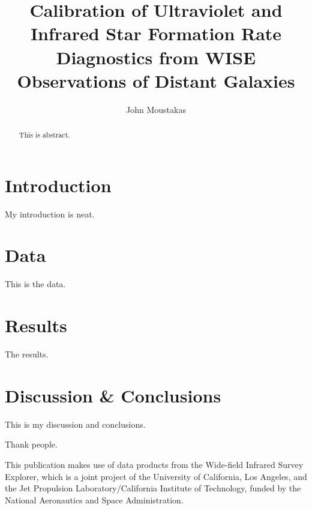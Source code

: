 \documentclass{emulateapj}
\begin{document}
\title{Calibration of Ultraviolet and Infrared Star Formation Rate
  Diagnostics from WISE Observations of Distant Galaxies}

\author{John Moustakas \etal}


\begin{abstract} 
This is abstract.
\end{abstract}


\section{Introduction}\label{sec:intro}
My introduction is neat.  \citep{wright10a}
\section{Data}\label{sec:data}
This is the data.

\section{Results}\label{sec:results}
The results.

\section{Discussion \& Conclusions}\label{sec:discussion}  
This is my discussion and conclusions.

\acknowledgements
Thank people.  

This publication makes use of data products from the Wide-field
Infrared Survey Explorer, which is a joint project of the University
of California, Los Angeles, and the Jet Propulsion
Laboratory/California Institute of Technology, funded by the National
Aeronautics and Space Administration.





\end{document}
